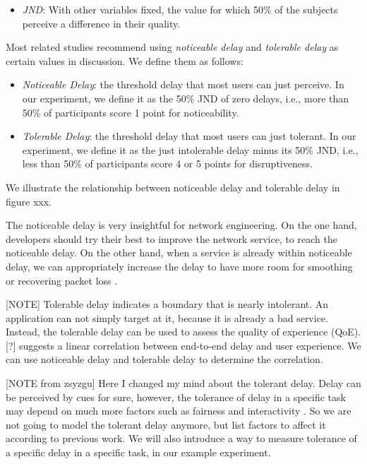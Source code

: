 \begin{itemize}
    \item \emph{JND}: With other variables fixed, the value for which 50\% of the subjects perceive a difference in their quality.
\end{itemize}

Most related studies recommend using \emph{noticeable delay} and \emph{tolerable delay} as certain values in discussion. We define them as follows:

\begin{itemize}
    \item \emph{Noticeable Delay}: the threshold delay that most users can just perceive. In our experiment, we define it as the 50\% JND of zero delays, i.e., more than 50\% of participants score 1 point for noticeability.
    
    \item \emph{Tolerable Delay}: the threshold delay that most users can just tolerant. In our experiment, we define it as the just intolerable delay minus its 50\% JND, i.e., less than 50\% of participants score 4 or 5 points for disruptiveness.
\end{itemize}

We illustrate the relationship between noticeable delay and tolerable delay in figure xxx.

The noticeable delay is very insightful for network engineering. On the one hand, developers should try their best to improve the network service, to reach the noticeable delay. On the other hand, when a service is already within noticeable delay, we can appropriately increase the delay to have more room for smoothing or recovering packet loss \cite{xu2013exploiting}.

[NOTE] Tolerable delay indicates a boundary that is nearly intolerant. An application can not simply target at it, because it is already a bad service. Instead, the tolerable delay can be used to assess the quality of experience (QoE). [?] suggests a linear correlation between end-to-end delay and user experience. We can use noticeable delay and tolerable delay to determine the correlation.

[NOTE from zsyzgu] Here I changed my mind about the tolerant delay. Delay can be perceived by cues for sure, however, the tolerance of delay in a specific task may depend on much more factors such as fairness and interactivity \cite{ishibashi2006subjective, montagud2012inter}. So we are not going to model the tolerant delay anymore, but list factors to affect it according to previous work. We will also introduce a way to measure tolerance of a specific delay in a specific task, in our example experiment.

